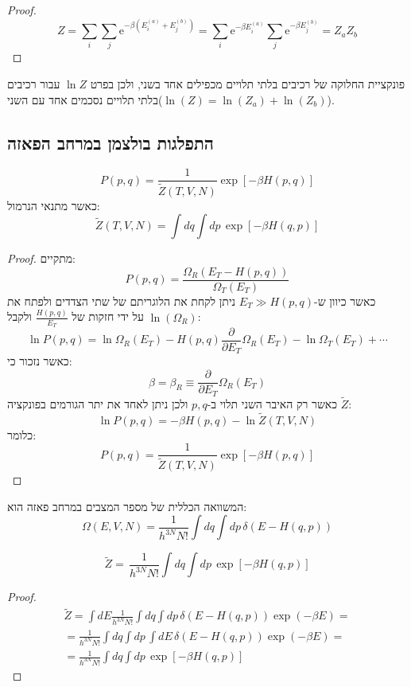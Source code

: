 \documentclass{tstextbook}
\begin{document}
\begin{proof}
$$Z=\sum_{i}\sum_{j}\mathrm{e}^{-\beta(E_{i}^{(a)}+E_{j}^{(b)})}=\sum_{i}\mathrm{e}^{-\beta E_{i}^{(a)}}\sum_{j}\mathrm{e}^{-\beta E_{j}^{(b)}}=Z_{a}Z_{b}$$

\end{proof}
\begin{corollary}
פונקציית החלוקה של רכיבים בלתי תלויים מכפילים אחד בשני, ולכן בפרט \(\ln Z\) עבור רכיבים בלתי תלויים נסכמים אחד עם השני(\(\ln(Z)=\ln(Z_{a})+\ln(Z_{b})\)).

\end{corollary}
\subsection{התפלגות בולצמן במרחב הפאזה}

\begin{proposition}
$$P(p,q)=\frac{1}{\tilde{Z}(T,V,N)}\exp[-\beta H(p,q)]$$
כאשר מתנאי הנרמול:
$$\tilde{Z}(T,V,N)=\int\!\!d q\int\!\!d p\,\exp[-\beta H(q,p)]$$

\end{proposition}
\begin{proof}
מתקיים:
$$P(p,q)=\frac{\Omega_{R}(E_{T}-H(p,q))}{\Omega_{T}(E_{T})}$$
כאשר כיוון ש-\(E_{T}\gg H(p,q)\) ניתן לקחת את הלוגריתם של שתי הצדדים ולפתח את \(\ln\left( \Omega_{R} \right)\) על ידי חזקות של \(\frac{H(p,q)}{E_{T}}\) ולקבל:
$$\ln P(p,q)=\ln\Omega_{R}(E_{T})-H(p,q)\frac{\partial}{\partial E_{T}}\Omega_{R}(E_{T})-\ln\Omega_{T}(E_{T})+\cdots$$
כאשר נזכור כי:
$$\beta=\beta_{R}\equiv\frac{\partial}{\partial E_{T}}\Omega_{R}(E_{T})$$
כאשר רק האיבר השני תלוי ב-\(p,q\) ולכן ניתן לאחד את יתר הגורמים בפונקציה \(\tilde{Z}\):
$$\ln P(p,q)=-\beta H(p,q)-\ln\tilde{Z}(T,V,N)$$
כלומר:
$$P(p,q)=\frac{1}{\tilde{Z}(T,V,N)}\exp[-\beta H(p,q)]$$

\end{proof}
\begin{reminder}
המשוואה הכללית של מספר המצבים במרחב פאזה הוא:
$$\Omega(E,V,N)=\frac{1}{h^{3N}N!}\int\!\!d q\int\!\!d p\,\delta(E-H(q,p))$$

\end{reminder}
\begin{corollary}
$$\widetilde{Z}=\,\frac{1}{h^{3N}N!}\int\!\!d q\int\!\!d p\,\exp[-\beta H(q,p)]$$

\end{corollary}
\begin{proof}
$$\begin{gather}\widetilde{Z}=\int\!\!d E\frac{1}{h^{3N}N!}\int\!\!d q\int\!\!d p\,\delta(E-H(q,p))\exp\left( -\beta E \right)=\\=\frac{1}{h^{3N}N!}\int\!\!d q\int\!\!d p\,\int\!\!d E\,\delta(E-H(q,p))\exp\left( -\beta E \right)=\\=\frac{1}{h^{3N}N!}\int\!\!d q\int\!\!d p\,\exp\left[ -\beta H(q,p) \right] 
\end{gather}$$

\end{proof}
\end{document}
